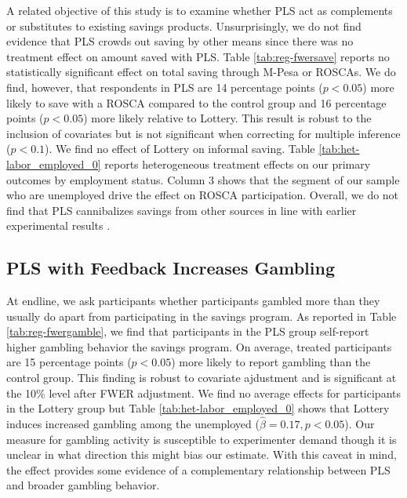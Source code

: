\documentclass[11pt]{article}
\begin{document}
		A related objective of this study is to examine whether PLS act as complements or substitutes to existing savings products. Unsurprisingly, we do not find evidence that PLS crowds out saving by other means since there was no treatment effect on amount saved with PLS. Table \ref{tab:reg-fwersave} reports no statistically significant effect on total saving through M-Pesa or ROSCAs. We do find, however, that respondents in PLS are 14 percentage points ($p < 0.05$) more likely to save with a ROSCA compared to the control group and 16 percentage points ($p < 0.05$) more likely relative to Lottery. This result is robust to the inclusion of covariates but is not significant when correcting for multiple inference ($p < 0.1$). We find no effect of Lottery on informal saving. Table \ref{tab:het-labor_employed_0} reports heterogeneous treatment effects on our primary outcomes by employment status. Column 3 shows that the segment of our sample who are unemployed drive the effect on ROSCA participation. Overall, we do not find that PLS cannibalizes savings from other sources in line with earlier experimental results \parencite{atalay_savings_2014,filiz-ozbay_lottery_2015,dizon_leveraging_2016}.

		
		

	\subsection{PLS with Feedback Increases Gambling}

		At endline, we ask participants whether participants gambled more than they usually do apart from participating in the savings program. As reported in Table \ref{tab:reg-fwergamble}, we find that participants in the PLS group self-report higher gambling behavior the savings program. On average, treated participants are 15 percentage points ($p < 0.05$) more likely to report gambling than the control group. This finding is robust to covariate ajdustment and is significant at the 10\% level after FWER adjustment. We find no average effects for participants in the Lottery group but Table \ref{tab:het-labor_employed_0} shows that Lottery induces increased gambling among the unemployed ($\hat \beta = 0.17, p < 0.05$). Our measure for gambling activity is susceptible to experimenter demand though it is unclear in what direction this might bias our estimate. With this caveat in mind, the effect provides some evidence of a complementary relationship between PLS and broader gambling behavior.
\end{document}

